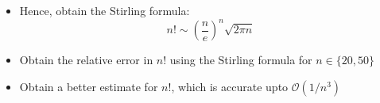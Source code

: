 \documentclass{article}
\begin{document}
\begin{enumerate}
\begin{itemize}
    \item Hence, obtain the Stirling formula:
        \begin{equation*}
            n! \sim \left(\frac{n}{e}\right)^{n} \sqrt{2\pi n}
        \end{equation*}

    \item Obtain the relative error in $n!$ using the Stirling formula for $n \in \{20,50\}$

    \item Obtain a better estimate for $n!$, which is accurate upto $\mathcal{O}(1/n^{3})$
\end{itemize}

\end{enumerate}
\end{document}
